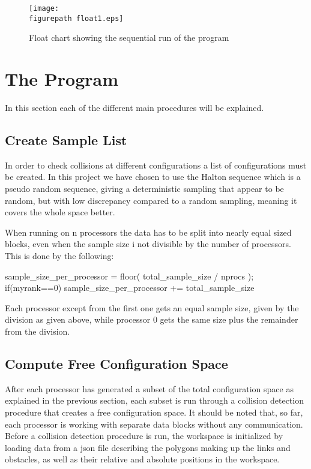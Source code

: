 \begin{figure}[h!] 
 \center 
 \texttt{[image: \\figurepath float1.eps]}
 \caption{ Float chart showing the sequential run of the program \label{fig:float1}}
 \end{figure}


\section{\textbf{The Program  }}

In this section each of the different main procedures will be explained.


\subsection{\textbf{Create Sample List}}

In order to check collisions at different configurations a list of configurations must be created. In this project we have chosen to use the Halton sequence which is a pseudo random sequence, giving a deterministic sampling that appear to be random, but with low discrepancy compared to a random sampling, meaning it covers the whole space better. 

When running on n processors the data has to be split into nearly equal sized blocks, even when the sample size i not divisible by the number of processors. This is done by the following:
\par

 \begin{pyglist}[language=java] 
	sample_size_per_processor = floor( total_sample_size / nprocs );
	if(myrank==0){
		sample_size_per_processor +=  total_sample_size %
	}
 \end{pyglist}


Each processor except from the first one gets an equal sample size, given by the division as given above, while processor 0 gets the same size plus the remainder from the division.



\subsection{\textbf{Compute Free Configuration Space}}
After each processor has generated a subset of the total configuration space as explained in the previous section, each subset is run through a collision detection procedure that creates a free configuration space. It should be noted that, so far, each processor is working with separate data blocks without any communication.  
Before a collision detection procedure is run, the workspace is initialized by loading data from a json file describing the polygons making up the links and obstacles, as well as their relative and absolute positions in the workspace. 


